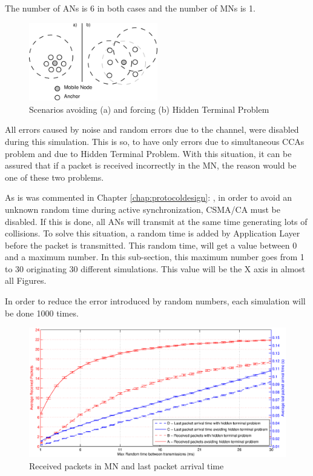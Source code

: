 The number of \acp{AN} is 6 in both cases and the number of \acp{MN} is 1.

\begin{figure}[ht]
 \begin{center}
  \includegraphics[width=0.5\textwidth]{hiddenvsnohidden.eps}
 \end{center}
 \caption{Scenarios avoiding (a) and forcing (b) Hidden Terminal Problem}
 \label{fig:hiddenvsnohidden}
\end{figure}

All errors caused by noise and random errors due to the channel, were disabled during this simulation. This is so, to have only errors due to 
simultaneous \acp{CCA} problem and due to Hidden Terminal Problem. With this situation, it can be assured that if a packet is received 
incorrectly in the \ac{MN}, the reason would be one of these two problems.

As is was commented in Chapter \ref{chap:protocoldesign}: , in order to avoid an unknown random time during active 
synchronization, \ac{CSMA/CA} must be disabled. If this is done, all \acp{AN} will transmit at the same time generating lots of collisions. 
To solve this situation, a random time is added by Application Layer before the packet is transmitted. This random time, will get a value
between 0 and a maximum number. In this sub-section, this maximum number goes from 1 to 30 originating 30 different simulations. This value will 
be the X axis in almost all Figures. 

In order to reduce the error introduced by random numbers, each simulation will be done 1000 times.

\begin{figure}[ht]
 \begin{center}
  \includegraphics[width=1\textwidth]{receivedPacketsAndLastPacketArrival.eps}
 \end{center}
 \caption{Received packets in \ac{MN} and last packet arrival time}
 \label{fig:receivedPacketsAndLastPacketArrival}
\end{figure}


